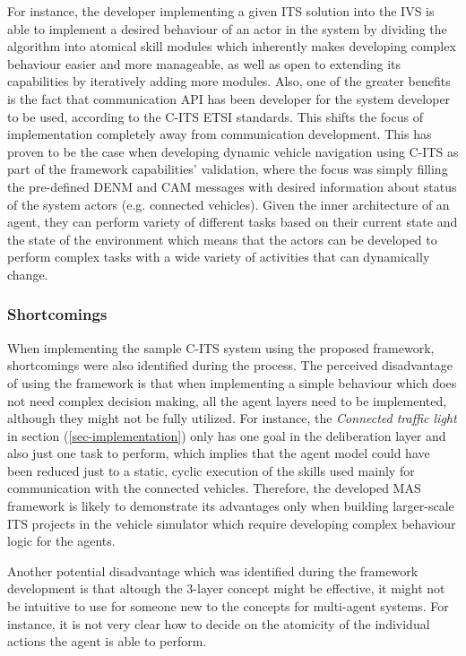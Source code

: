 \documentclass[main.tex]{subfiles}
\begin{document}
For instance, the developer implementing a given ITS solution into the IVS is able to implement a desired behaviour of an actor in 
the system by dividing the algorithm into atomical skill modules which inherently makes developing complex behaviour easier and more 
manageable, as well as open to extending its capabilities by iteratively adding more modules. Also, one of the greater benefits is 
the fact that communication API has been developer for the system developer to be used, according to the C-ITS ETSI standards. This 
shifts the focus of implementation completely away from communication development. This has proven to be the case when developing 
dynamic vehicle navigation using C-ITS as part of the framework capabilities' validation, where
the focus was simply filling the pre-defined DENM and CAM messages with desired information
about status of the system actors (e.g. connected vehicles). Given the inner architecture of an agent, they can perform variety 
of different tasks based on their current state and the state of the environment which means that the actors can be developed 
to perform complex tasks with a wide variety of activities that can dynamically change. 

\subsubsection{Shortcomings}

When implementing the sample C-ITS system using the proposed framework, shortcomings were also identified during the process. The 
perceived disadvantage of using the framework is that when implementing a simple behaviour which does not need complex decision making,
all the agent layers need to be implemented, although they might not be fully utilized. For instance, the \emph{Connected 
traffic light} in section (\ref{sec-implementation}) only has one goal in the deliberation layer and also just one task to perform, 
which implies that the agent model could have been reduced just to a static, cyclic execution of the skills used mainly for communication with the 
connected vehicles. Therefore, the developed MAS framework is likely to demonstrate its advantages only when building larger-scale 
ITS projects in the vehicle simulator which require developing complex behaviour logic for the agents. 

Another potential disadvantage which was identified during the framework development is that altough the 3-layer concept might be 
effective, it might not be intuitive to use for someone new to the concepts for multi-agent systems. For instance, it is not very 
clear how to decide on the atomicity of the individual actions the agent is able to perform. 
\end{document}

